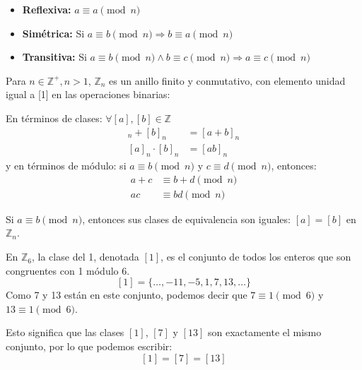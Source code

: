 \documentclass[12pt]{article}
\begin{document}
\begin{tcolorbox}[title=Relación de equivalencia]
\begin{itemize}
    \item \textbf{Reflexiva:} \( a \equiv a \pmod{n} \)
    \item \textbf{Simétrica:} Si \( a \equiv b \pmod{n} \Rightarrow b \equiv a \pmod{n} \)
    \item \textbf{Transitiva:} Si \( a \equiv b \pmod{n} \land b \equiv c \pmod{n} \Rightarrow a \equiv c \pmod{n} \)
\end{itemize}
\end{tcolorbox}

\begin{tcolorbox}[title=Anillo de enteros \( \pmod{n} \)]
Para \( n \in \mathbb{Z}^+, n > 1 \), \( \mathbb{Z}_n \) es un anillo finito y conmutativo, con elemento unidad igual a [1] en las operaciones binarias:

\bigskip

En términos de clases: \( \forall [a], [b] \in \mathbb{Z} \)
\begin{align*}
    [a]_n + [b]_n &= [a + b]_n \\
    [a]_n \cdot [b]_n &= [a b]_n
\end{align*}
y en términos de módulo: si \( a \equiv b \pmod{n} \) y \( c \equiv d \pmod{n} \), entonces:
\begin{align*}
    a + c &\equiv b + d \pmod{n} \\
    ac &\equiv bd \pmod{n}   
\end{align*}
\end{tcolorbox}

\begin{tcolorbox}[colback=yellow!15, title=Nota]

Si \( a \equiv b \pmod{n} \), entonces sus clases de equivalencia son iguales: \( [a] = [b] \) en \( \mathbb{Z}_n \).
\end{tcolorbox}

\begin{tcolorbox}[title=Ejemplo de clases de equivalencia]
En \( \mathbb{Z}_6 \), la clase del 1, denotada \( [1] \), es el conjunto de todos los enteros que son congruentes con 1 módulo 6.
\[ [1] = \{ \dots, -11, -5, 1, 7, 13, \dots \} \]
Como 7 y 13 están en este conjunto, podemos decir que \( 7 \equiv 1 \pmod{6} \) y \( 13 \equiv 1 \pmod{6} \).

\bigskip

Esto significa que las clases \( [1] \), \( [7] \) y \( [13] \) son exactamente el mismo conjunto, por lo que podemos escribir:
\[ [1] = [7] = [13] \]
\end{tcolorbox}
\end{document}
